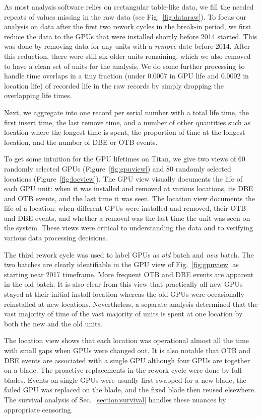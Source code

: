 As most analysis software relies on rectangular table-like data, we
fill the needed repeats of values missing in the raw data (see
Fig.~\ref{fig:dataraw}). To focus our analysis on data after the first
two rework cycles in the break-in period, we first reduce the data to
the GPUs that were installed shortly before 2014 started. This was
done by removing data for any units with a {\em remove} date before
2014. After this reduction, there were still six older units remaining,
which we also removed to have a clean set of units for the
analysis. We do some further processing to handle time overlaps in a
tiny fraction (under 0.0007 in GPU life and 0.0002 in location life)
of recorded life in the raw records by simply dropping the overlapping
life times.

Next, we aggregate into one record per serial number with a total life
time, the first insert time, the last remove time, and a number of
other quantities such as location where the longest time is spent, the
proportion of time at the longest location, and the number of DBE or
OTB events.

To get some intuition for the GPU lifetimes on Titan, we give two
views of 60 randomly selected GPUs (Figure~\ref{fig:gpuview}) and 80
randomly selected locations (Figure~\ref{fig:locview}).
The GPU view
visually documents the life of each GPU unit: when it was installed and
removed at various locations, its DBE and OTB events, and the last
time it was seen. The location view documents the life of a location:
when different GPUs were installed and removed, their OTB and DBE
events, and whether a removal was the last time the unit was seen on
the system. These views were critical to understanding the data and to
verifying various data processing decisions.

The third rework cycle was used to label GPUs as {\em old} batch and
{\em new} batch. The two batches are clearly identifiable in the GPU
view of Fig.~\ref{fig:gpuview} as starting near 2017 timeframe. More
frequent OTB and DBE events are apparent in the old batch. It is also
clear from this view that practically all new GPUs stayed at their
initial install location whereas the old GPUs were occasionally
reinstalled at new locations. Nevertheless, a separate analysis
determined that the vast majority of time of the vast majority of
units is spent at one location by both the new and the old units.

The location view shows that each location was operational almost all
the time with small gaps when GPUs were changed out. It is also
notable that OTB and DBE events are associated with a single GPU
although four GPUs are together on a blade. The proactive replacements
in the rework cycle were done by full blades. Events on single GPUs
were usually first swapped for a new blade, the failed GPU was
replaced on the blade, and the fixed blade then reused elsewhere. The
survival analysis of Sec.~\ref{section:survival} handles these nuances
by appropriate censoring.
